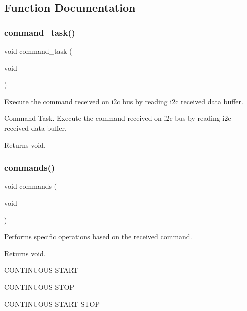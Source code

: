 \subsection{Function Documentation}
\mbox{\label{i2c-rain_8h_a9f32a4169471a435e9364460d7b1761d}} 
\subsubsection{\texorpdfstring{command\+\_\+task()}{command\_task()}}
{\footnotesize\ttfamily void command\+\_\+task (\begin{DoxyParamCaption}\item[{void}]{ }\end{DoxyParamCaption})}



Execute the command received on i2c bus by reading i2c received data buffer. 

Command Task. Execute the command received on i2c bus by reading i2c received data buffer.

\begin{DoxyReturn}{Returns}
void. 
\end{DoxyReturn}
\mbox{\label{i2c-rain_8h_aaad2f6556489c51f2c24302e2cb4188a}} 
\subsubsection{\texorpdfstring{commands()}{commands()}}
{\footnotesize\ttfamily void commands (\begin{DoxyParamCaption}\item[{void}]{ }\end{DoxyParamCaption})}



Performs specific operations based on the received command. 

\begin{DoxyReturn}{Returns}
void. 
\end{DoxyReturn}
C\+O\+N\+T\+I\+N\+U\+O\+US S\+T\+A\+RT

C\+O\+N\+T\+I\+N\+U\+O\+US S\+T\+OP

C\+O\+N\+T\+I\+N\+U\+O\+US S\+T\+A\+R\+T-\/\+S\+T\+OP

